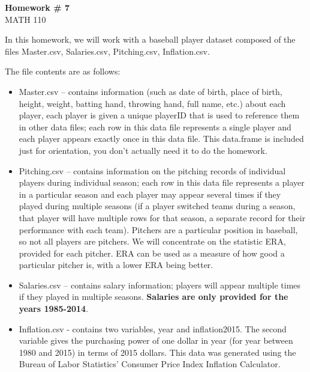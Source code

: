 \documentclass{article}
\begin{document}
\renewcommand{\a}{\textbf{a}}
\renewcommand{\b}{\textbf{b}}
\renewcommand{\d}{\textbf{d}}
\newcommand{\e}{\textbf{e}}

\large

\begin{center}
\textbf{Homework \# 7} \\  
MATH 110\\
\end{center}

\medskip

In this homework, we will work with a baseball player dataset composed of the files Master.csv, Salaries.csv, Pitching.csv, Inflation.csv. 

The file contents are as follows:
\begin{itemize}
\item  Master.csv – contains information (such as date of birth, place of birth, height, weight, batting hand, throwing hand, full name, etc.) about each player, each player is given a unique playerID that is used to reference them in other data files; each row in this data file represents a single player and each player appears exactly once in this data file.  This data.frame is included just for orientation, you don't actually need it to do the homework.
\item Pitching.csv – contains information on the pitching records of individual players during individual season; each row in this data file represents a player in a particular season and each player may appear several times if they played during multiple seasons (if a player switched teams during a season, that player will have multiple rows for that season, a separate record for their performance with each team).   Pitchers are a particular position in baseball, so not all players are pitchers.  We will concentrate on the statistic ERA, provided for each pitcher.  ERA can be used as a measure of how good a particular pitcher is, with a lower ERA being better.
\item Salaries.csv – contains salary information; players will appear multiple times if they played in multiple seasons.  \textbf{Salaries are only provided for the years 1985-2014}.
\item Inflation.csv - contains two variables, year and inflation2015. The second variable gives the purchasing power of one dollar in year (for year between 1980 and 2015) in terms of 2015 dollars. This data was generated using the Bureau of Labor Statistics’ Consumer Price Index Inflation Calculator.
\end{itemize}
\end{document}
